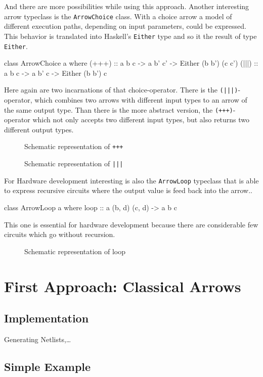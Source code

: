 \documentclass[9pt,final,a4paper,leqno]{article}
\newcommand{\xfig}[4][0.9] {%
    \begin{figure}[ht]
        \begin{center}
            \graphicspath{{./}{Images/}}
            \scalebox{#1}{%
                
            }
            \caption{\label{#4} #3}
        \end{center}
    \end{figure}
}
\newcommand{\hs}[1]{\mbox{\lstinline[basicstyle=\color{textgray}]!#1!}}
\begin{document}
\par
And there are more possibilities while using this approach. Another interesting arrow typeclass is the \hs{ArrowChoice} class. With a choice
arrow a model of different execution paths, depending on input parameters, could be expressed. This behavior is translated into Haskell's
\hs{Either} type and so it the result of type \hs{Either}. 

\begin{haskell}[]
class ArrowChoice a where
  (+++) :: a b c -> a b' c' -> Either (b b') (c c')
  (|||) :: a b c -> a b' c  -> Either (b b')  c 
\end{haskell}

Here again are two incarnations of that choice-operator. There is the \hs{(|||)}-operator, which combines two arrows with different input
types to an arrow of the same output type. Than there is the more abstract version, the \hs{(+++)}-operator which not only accepts two different input types, but also returns two different output types.  

\xfig[.8]{ArrowPlPlPl}{Schematic representation of \hs{+++}}{figure:plplpl}
\xfig[.8]{ArrowPiPiPi}{Schematic representation of \hs{|||}}{figure:pipipi}

\par
For Hardware development interesting is also the \hs{ArrowLoop} typeclass that is able to express recursive circuits where the output value
is feed back into the arrow..
\begin{haskell}[]
class ArrowLoop a where
  loop :: a (b, d) (c, d) -> a b c
\end{haskell}

This one is essential for hardware development because there are considerable few circuits which go without recursion. 

\xfig[.8]{ArrowLp}{Schematic representation of loop}{figure:loop}




\section{First Approach: Classical Arrows}

\subsection{Implementation}

Generating Netlists,\ldots

\subsection{Simple Example}
\end{document}
